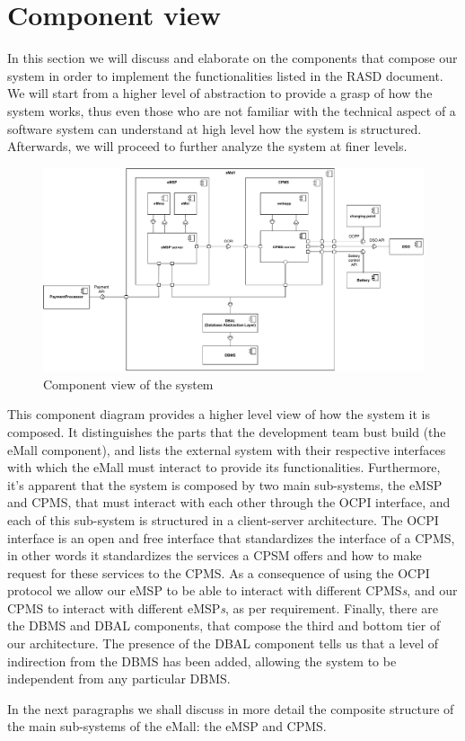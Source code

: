 \section{Component view}
In this section we will discuss and elaborate on the components that compose our system in order to implement the functionalities listed in the RASD document. We will start from a higher level of abstraction to provide a grasp of how the system works, thus even those who are not familiar with the technical aspect of a software system can understand at high level how the system is structured. Afterwards, we will proceed to further analyze the system at finer levels.
\begin{figure}[H]
    \centering
    \includegraphics[width=1\textwidth]{Images/cp2/component_overview.pdf}
    \caption{Component view of the system}
\end{figure}

This component diagram provides a higher level view of how the system it is composed. It distinguishes the parts that the development team bust build (the eMall component), and lists the external system with their respective interfaces with which the eMall must interact to provide its functionalities. Furthermore, it's apparent that the system is composed by two main sub-systems, the eMSP and CPMS, that must interact with each other through the OCPI interface, and each of this sub-system is structured in a client-server architecture. The OCPI interface is an open and free interface that standardizes the interface of a CPMS, in other words it standardizes the services a CPSM offers and how to make request for these services to the CPMS. As a consequence of using the OCPI protocol we allow our eMSP to be able to interact with different CPMS\textit{s}, and our CPMS to interact with different eMSP\textit{s}, as per requirement. Finally, there are the DBMS and DBAL components, that compose the third and bottom tier of our architecture. The presence of the DBAL component tells us that a level of indirection from the DBMS has been added, allowing the system to be independent from any particular DBMS.
\par
In the next paragraphs we shall discuss in more detail the composite structure of the main sub-systems of the eMall: the eMSP and CPMS.
\pagebreak

